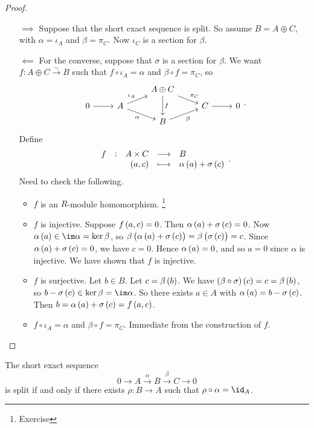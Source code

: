 \begin{proof}
\hfill
\begin{itemize}
\item[$ \implies $] Suppose that the short exact sequence is split. So assume $ B = A \oplus C $, with $ \alpha = \iota_A $ and $ \beta = \pi_C $. Now $ \iota_C $ is a section for $ \beta $.
\item[$ \impliedby $] For the converse, suppose that $ \sigma $ is a section for $ \beta $. We want $ f : A \oplus C \xrightarrow{\sim} B $ such that $ f \circ \iota_A = \alpha $ and $ \beta \circ f = \pi_C $, so
$$
\begin{tikzcd}[row sep=tiny]
& & A \oplus C \arrow{dr}{\pi_C} \arrow{dd}{f} & & \\
0 \arrow{r} & A \arrow{ur}{\iota_A} \arrow{dr}[swap]{\alpha} & & C \arrow{r} & 0 \\
& & B \arrow{ur}[swap]{\beta} & &
\end{tikzcd}.
$$
Define
$$ \function[f]{A \times C}{B}{\br{a, c}}{\alpha\br{a} + \sigma\br{c}}. $$
Need to check the following.
\begin{itemize}
\item $ f $ is an $ R $-module homomorphism. \footnote{Exercise}
\item $ f $ is injective. Suppose $ f\br{a, c} = 0 $. Then $ \alpha\br{a} + \sigma\br{c} = 0 $. Now $ \alpha\br{a} \in \im \alpha = \ker \beta $, so $ \beta\br{\alpha\br{a} + \sigma\br{c}} = \beta\br{\sigma\br{c}} = c $. Since $ \alpha\br{a} + \sigma\br{c} = 0 $, we have $ c = 0 $. Hence $ \alpha\br{a} = 0 $, and so $ a = 0 $ since $ \alpha $ is injective. We have shown that $ f $ is injective.
\item $ f $ is surjective. Let $ b \in B $. Let $ c = \beta\br{b} $. We have $ \br{\beta \circ \sigma}\br{c} = c = \beta\br{b} $, so $ b - \sigma\br{c} \in \ker \beta = \im \alpha $. So there exists $ a \in A $ with $ \alpha\br{a} = b - \sigma\br{c} $. Then $ b = \alpha\br{a} + \sigma\br{c} = f\br{a, c} $.
\item $ f \circ \iota_A = \alpha $ and $ \beta \circ f = \pi_C $. Immediate from the construction of $ f $.
\end{itemize}
\end{itemize}
\end{proof}

\begin{proposition}
The short exact sequence
$$ 0 \to A \xrightarrow{\alpha} B \xrightarrow{\beta} C \to 0 $$
is split if and only if there exists $ \rho : B \to A $ such that $ \rho \circ \alpha = \id_A $.
\end{proposition}

